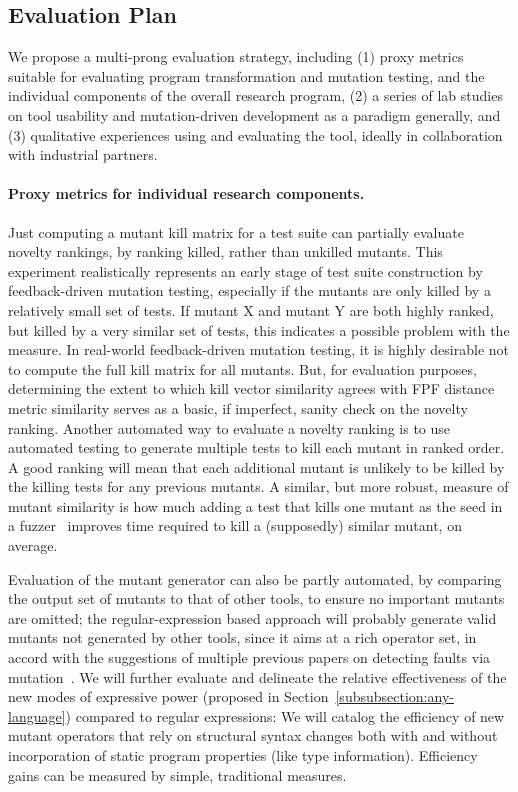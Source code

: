 
\subsection{Evaluation Plan}
\label{sec:evalplan}

We propose a multi-prong evaluation strategy, including (1) proxy metrics
suitable for evaluating program transformation and mutation testing, and the
individual components of the overall research program, (2) a series of lab
studies on tool usability and mutation-driven development as a paradigm
generally, and (3) qualitative experiences using and evaluating the tool,
ideally in collaboration with industrial partners.

\paragraph{Proxy metrics for individual research components.}
Just computing a mutant kill matrix for a test suite can
partially evaluate novelty rankings, by ranking
killed, rather than unkilled mutants. This experiment
realistically represents an early stage of test suite construction by
feedback-driven mutation testing, especially if the mutants are only
killed by a relatively small set of tests.  If
mutant X and mutant Y are both highly ranked, but killed by a very
similar set of tests, this indicates a possible problem with the
measure.  In real-world feedback-driven mutation testing, it is highly
desirable not to compute the full kill matrix for all mutants. But,
for evaluation purposes, determining the extent to which kill
vector similarity agrees with FPF distance metric similarity serves
as a basic, if imperfect, sanity check on the novelty ranking.
Another automated way to evaluate a novelty ranking is to use automated
testing to generate multiple tests to kill each mutant in ranked order.  A good ranking will mean
that each additional mutant is unlikely to be killed by the killing
tests for any previous mutants.  A similar, but more robust, measure of mutant similarity
is how much adding a test that kills one mutant as the seed in a
fuzzer~\cite{aflfuzz,libfuzzer} improves time required to kill a
(supposedly) similar
mutant, on average.

Evaluation of the mutant generator can also be partly automated, by
comparing the output set of mutants to that of other tools, to ensure
no important mutants are omitted; the regular-expression based
approach will probably generate valid mutants not generated by other
tools, since it aims at a rich operator set, in accord with the
suggestions of multiple previous papers on detecting faults via
mutation~\cite{just2014mutants,gopinath2017mutation}.
We will further evaluate and delineate the relative effectiveness of the new modes of expressive power (proposed in Section~\ref{subsubsection:any-language}) compared to regular expressions: We will catalog the efficiency of new mutant operators that rely on structural syntax changes both with and without incorporation of static program properties (like type information).
Efficiency
gains can
be measured by simple, traditional measures.

